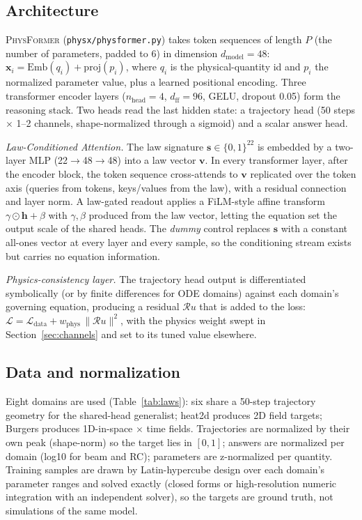\documentclass[11pt,a4paper]{article}
\newcommand{\PT}{{\scshape PhysFormer}}
\begin{document}
\subsection{Architecture}
\label{sec:arch}

\PT{} (\texttt{physx/physformer.py}) takes token sequences of length $P$ (the
number of parameters, padded to 6) in dimension $d_{\mathrm{model}} = 48$:
$\mathbf{x}_i = \mathrm{Emb}(q_i) + \mathrm{proj}(p_i)$, where $q_i$ is the
physical-quantity id and $p_i$ the normalized parameter value, plus a learned
positional encoding. Three transformer encoder layers ($n_{\mathrm{head}}=4$,
$d_{\mathrm{ff}}=96$, GELU, dropout 0.05) form the reasoning stack. Two heads
read the last hidden state: a trajectory head (50 steps $\times$ 1--2
channels, shape-normalized through a sigmoid) and a scalar answer head.

\emph{Law-Conditioned Attention.} The law signature $\mathbf{s} \in
\{0,1\}^{22}$ is embedded by a two-layer MLP (22$\to$48$\to$48) into a law
vector $\mathbf{v}$. In every transformer layer, after the encoder block, the
token sequence cross-attends to $\mathbf{v}$ replicated over the token axis
(queries from tokens, keys/values from the law), with a residual connection
and layer norm. A law-gated readout applies a FiLM-style affine transform
$\gamma \odot \mathbf{h} + \beta$ with $\gamma, \beta$ produced from the law
vector, letting the equation set the output scale of the shared heads. The
\emph{dummy} control replaces $\mathbf{s}$ with a constant all-ones vector at
every layer and every sample, so the conditioning stream exists but carries
no equation information.

\emph{Physics-consistency layer.} The trajectory head output is differentiated
symbolically (or by finite differences for ODE domains) against each domain's
governing equation, producing a residual $\mathcal{R}u$ that is added to the
loss: $\mathcal{L} = \mathcal{L}_{\mathrm{data}} +
w_{\mathrm{phys}}\,\|\mathcal{R}u\|^2$, with the physics weight swept in
Section~\ref{sec:channels} and set to its tuned value elsewhere.

\subsection{Data and normalization}
\label{sec:data}

Eight domains are used (Table~\ref{tab:laws}): six share a 50-step trajectory
geometry for the shared-head generalist; heat2d produces 2D field targets;
Burgers produces 1D-in-space $\times$ time fields. Trajectories are
normalized by their own peak (shape-norm) so the target lies in $[0,1]$;
answers are normalized per domain (log10 for beam and RC); parameters are
z-normalized per quantity. Training samples are drawn by Latin-hypercube
design over each domain's parameter ranges and solved exactly (closed forms
or high-resolution numeric integration with an independent solver), so the
targets are ground truth, not simulations of the same model.
\end{document}
